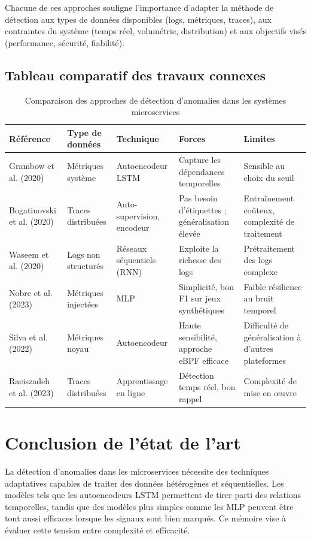 \documentclass[a4paper,12pt]{report}
\begin{document}
Chacune de ces approches souligne l’importance d’adapter la méthode de détection aux types de données disponibles (logs, métriques, traces), aux contraintes du système (temps réel, volumétrie, distribution) et aux objectifs visés (performance, sécurité, fiabilité).

\subsection*{Tableau comparatif des travaux connexes}
\begin{table}[H]
\centering
\caption{Comparaison des approches de détection d’anomalies dans les systèmes microservices}
\label{tab:comparaison_travaux_connexes}
\begin{tabular}{|p{3.2cm}|p{2.8cm}|p{3cm}|p{3.4cm}|p{3.4cm}|}
\hline
\textbf{Référence} & \textbf{Type de données} & \textbf{Technique} & \textbf{Forces} & \textbf{Limites} \\
\hline
Grambow et al. (2020) & Métriques système & Autoencodeur LSTM & Capture les dépendances temporelles & Sensible au choix du seuil \\
\hline
Bogatinovski et al. (2020) & Traces distribuées & Auto-supervision, encodeur & Pas besoin d’étiquettes ; généralisation élevée & Entraînement coûteux, complexité de traitement \\
\hline
Waseem et al. (2020) & Logs non structurés & Réseaux séquentiels (RNN) & Exploite la richesse des logs & Prétraitement des logs complexe \\
\hline
Nobre et al. (2023) & Métriques injectées & MLP & Simplicité, bon F1 sur jeux synthétiques & Faible résilience au bruit temporel \\
\hline
Silva et al. (2022) & Métriques noyau & Autoencodeur & Haute sensibilité, approche eBPF efficace & Difficulté de généralisation à d'autres plateformes \\
\hline
Raeiszadeh et al. (2023) & Traces distribuées & Apprentissage en ligne & Détection temps réel, bon rappel & Complexité de mise en œuvre \\
\hline
\end{tabular}
\end{table}

\section*{Conclusion de l’état de l’art}

La détection d’anomalies dans les microservices nécessite des techniques adaptatives capables de traiter des données hétérogènes et séquentielles. Les modèles tels que les autoencodeurs LSTM permettent de tirer parti des relations temporelles, tandis que des modèles plus simples comme les MLP peuvent être tout aussi efficaces lorsque les signaux sont bien marqués. Ce mémoire vise à évaluer cette tension entre complexité et efficacité.
\end{document}
